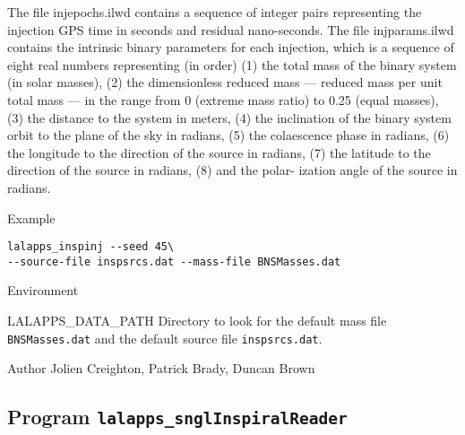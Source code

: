 \begin{entry}
\begin{entry}
The  file  injepochs.ilwd  contains  a sequence of integer pairs representing
the injection GPS time in  seconds  and residual  nano-seconds.   The file
injparams.ilwd contains the intrinsic binary parameters for each injection,
which is  a  sequence  of  eight  real  numbers representing (in order) (1) the
total mass of the binary system  (in  solar masses),  (2)  the  dimensionless
reduced mass --- reduced mass per unit total mass --- in the range from  0
(extreme mass  ratio)  to  0.25 (equal masses), (3) the distance to the system
in meters, (4) the inclination  of  the  binary system  orbit  to the plane of
the sky in radians, (5) the colaescence phase in radians, (6)  the  longitude
to  the direction  of  the  source in radians, (7) the latitude to the
direction of the source in radians, (8) and the polar- ization angle of the
source in radians.
\end{entry}

\item[Example]
\begin{verbatim}
lalapps_inspinj --seed 45\
--source-file inspsrcs.dat --mass-file BNSMasses.dat
\end{verbatim}

\item[Environment]\leavevmode
\begin{entry}
\item[LALAPPS\_DATA\_PATH] Directory to look for the default mass
file \verb+BNSMasses.dat+ and the default source file \verb+inspsrcs.dat+.
\end{entry}


\item[Author] 
Jolien Creighton, Patrick Brady, Duncan Brown
\end{entry}

%
% 
\clearpage
\subsection{Program \texttt{lalapps\_snglInspiralReader}}
\label{program:lalapps-snglInspiralReader}

